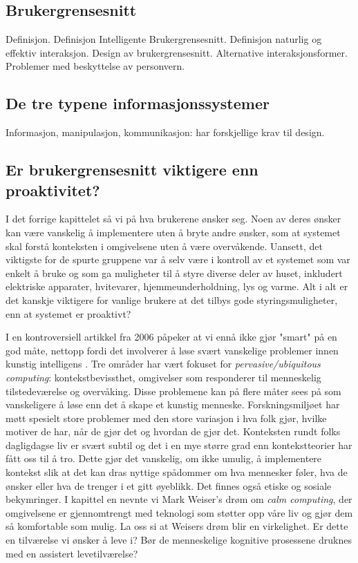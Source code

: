 \subsection*{Brukergrensesnitt}
Definisjon. Definisjon Intelligente Brukergrensesnitt. Definisjon naturlig og effektiv interaksjon. Design av brukergrensesnitt. Alternative interaksjonsformer. Problemer med beskyttelse av personvern.

\subsection*{De tre typene informasjonssystemer}
Informasjon, manipulasjon, kommunikasjon: har forskjellige krav til design.

\subsection*{Er brukergrensesnitt viktigere enn proaktivitet?}
I det forrige kapittelet så vi på hva brukerene ønsker seg. Noen av deres ønsker kan være vanskelig å implementere uten å bryte andre ønsker, som at systemet skal forstå konteksten i omgivelsene uten å være overvåkende. Uansett, det viktigste for de spurte gruppene var å selv være i kontroll av et systemet som var enkelt å bruke og som ga muligheter til å styre diverse deler av huset, inkludert elektriske apparater, hvitevarer, hjemmeunderholdning, lys og varme. Alt i alt er det kanskje viktigere for vanlige brukere at det tilbys gode styringsmuligheter, enn at systemet er proaktivt?

I en kontroversiell artikkel fra 2006 påpeker \citet{rogers06} at vi ennå ikke gjør "smart" på en god måte, nettopp fordi det involverer å løse svært vanskelige problemer innen kunstig intelligens . Tre områder har vært fokuset for \emph{pervasive/ubiquitous computing}: kontekstbevissthet, omgivelser som responderer til menneskelig tilstedeværelse og overvåking. Disse problemene kan på flere måter sees på som vanskeligere å løse enn det å skape et kunstig menneske. Forskningsmiljøet har møtt spesielt store problemer med den store variasjon i hva folk gjør, hvilke motiver de har, når de gjør det og hvordan de gjør det. Konteksten rundt folks dagligdagse liv er svært subtil og det i en mye større grad enn kontekstteorier har fått oss til å tro. Dette gjør det vanskelig, om ikke umulig, å implementere kontekst slik at det kan dras nyttige spådommer om hva mennesker føler, hva de ønsker eller hva de trenger i et gitt øyeblikk. Det finnes også etiske og sosiale bekymringer. I kapittel en nevnte vi Mark Weiser's drøm om \emph{calm computing}, der omgivelsene er gjennomtrengt med teknologi som støtter opp våre liv og gjør dem så komfortable som mulig. La oss si at Weisers drøm blir en virkelighet. Er dette en tilværelse vi ønsker å leve i? Bør de menneskelige kognitive prosessene druknes med en assistert levetilværelse?

